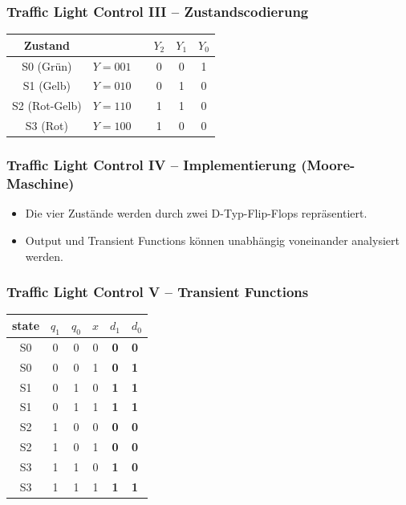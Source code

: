 \documentclass[11pt,a4paper]{article}
\begin{document}
\subsubsection{Traffic Light Control III -- Zustandscodierung}
\begin{center}
\begin{tabular}{ccc|ccc}
    \toprule
    Zustand & & & $Y_2$ & $Y_1$ & $Y_0$ \\ \midrule
    S0 (Grün) & $Y=001$ & & 0 & 0 & 1 \\
    S1 (Gelb) & $Y=010$ & & 0 & 1 & 0 \\
    S2 (Rot-Gelb) & $Y=110$ & & 1 & 1 & 0 \\
    S3 (Rot) & $Y=100$ & & 1 & 0 & 0 \\ \bottomrule
\end{tabular}
\end{center}

\subsubsection{Traffic Light Control IV -- Implementierung (Moore-Maschine)}
\begin{itemize}
    \item Die vier Zustände werden durch zwei D-Typ-Flip-Flops repräsentiert.
    \item Output und Transient Functions können unabhängig voneinander analysiert werden.
\end{itemize}

\subsubsection{Traffic Light Control V -- Transient Functions}
\begin{center}
\begin{tabular}{cc|c|cc}
    \toprule
    state & $q_1$ & $q_0$ & $x$ & $d_1$ & $d_0$ \\ \midrule
    S0 & 0 & 0 & 0 & \textbf{0} & \textbf{0} \\
    S0 & 0 & 0 & 1 & \textbf{0} & \textbf{1} \\
    S1 & 0 & 1 & 0 & \textbf{1} & \textbf{1} \\
    S1 & 0 & 1 & 1 & \textbf{1} & \textbf{1} \\
    S2 & 1 & 0 & 0 & \textbf{0} & \textbf{0} \\
    S2 & 1 & 0 & 1 & \textbf{0} & \textbf{0} \\
    S3 & 1 & 1 & 0 & \textbf{1} & \textbf{0} \\
    S3 & 1 & 1 & 1 & \textbf{1} & \textbf{1} \\ \bottomrule
\end{tabular}
\end{center}
\end{document}
